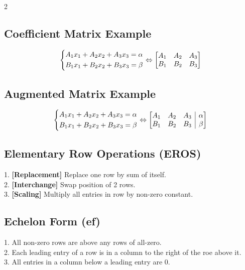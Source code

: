 \documentclass[5pt]{article}
\makeatletter
\newenvironment{amatrix}[1]{%
  \left[\begin{array}{@{}*{#1}{c}|c@{}}
}{%
  \end{array}\right]
}
\makeatother
\begin{document}
\begin{multicols}{2}
\subsection{Coefficient Matrix Example}
\begin{equation}
\centering
\left\{\begin{split}
A_1x_1+A_2x_2+A_3x_3=\alpha \\
B_1x_1+B_2x_2+B_3x_3=\beta \\
\end{split}\right.
\Leftrightarrow
\begin{bmatrix}
    A_1 & A_2 & A_3\\
    B_1 & B_2 & B_3\\
\end{bmatrix}
\end{equation}

\subsection{Augmented Matrix Example}
\begin{equation}
\left\{\begin{split}
A_1x_1+A_2x_2+A_3x_3=\alpha \\
B_1x_1+B_2x_2+B_3x_3=\beta \\
\end{split}\right.
\Leftrightarrow
\begin{amatrix}{3}
    A_1 & A_2 & A_3 & \alpha \\
    B_1 & B_2 & B_3 & \beta \\
 \end{amatrix}
\end{equation}

\subsection{Elementary Row Operations (EROS)}
1. \textbf{[Replacement]} Replace one row by sum of itself. \\
2. \textbf{[Interchange]} Swap position of 2 rows. \\
3. \textbf{[Scaling]} Multiply all entries in row by non-zero constant. \\


\subsection{Echelon Form (ef)}
1. All non-zero rows are above any rows of all-zero. \\
2. Each leading entry of a row is in a column to the right of the roe above it. \\
3. All entries in a column below a leading entry are 0. \\



\end{multicols}
\end{document}
